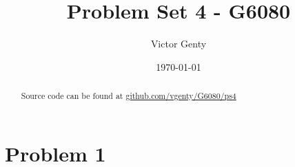\documentclass[singlepage,notitlepage,nofootinbib,11pt]{revtex4-1}
\begin{document}
\title{Problem Set 4 - G6080}
\author{Victor Genty}
\date{\today}
\begin{abstract}
\centering
Source code can be found at \href{https://github.com/vgenty/G6080/tree/master/ps3}{github.com/vgenty/G6080/ps4}
\end{abstract}
\maketitle
\section{Problem 1}
\end{document}
